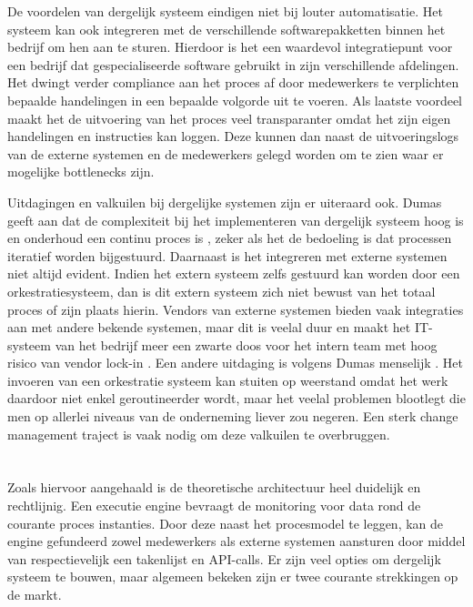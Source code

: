 De voordelen van dergelijk systeem eindigen niet bij louter automatisatie. Het systeem kan ook integreren met de verschillende softwarepakketten binnen het bedrijf om hen aan te sturen. Hierdoor is het een waardevol integratiepunt voor een bedrijf dat gespecialiseerde software gebruikt in zijn verschillende afdelingen. Het dwingt verder compliance aan het proces af door medewerkers te verplichten bepaalde handelingen in een bepaalde volgorde uit te voeren. Als laatste voordeel maakt het de uitvoering van het proces veel transparanter omdat het zijn eigen handelingen en instructies kan loggen. Deze kunnen dan naast de uitvoeringslogs van de externe systemen en de medewerkers gelegd worden om te zien waar er mogelijke bottlenecks zijn. \newline

Uitdagingen en valkuilen bij dergelijke systemen zijn er uiteraard ook. Dumas geeft aan dat de complexiteit bij het implementeren van dergelijk systeem hoog is en onderhoud een continu proces is \autocite[pp. 360-363]{Dumas2018}, zeker als het de bedoeling is dat processen iteratief worden bijgestuurd. Daarnaast is het integreren met externe systemen niet altijd evident. Indien het extern systeem zelfs gestuurd kan worden door een orkestratiesysteem, dan is dit extern systeem zich niet bewust van het totaal proces of zijn plaats hierin. Vendors van externe systemen bieden vaak integraties aan met andere bekende systemen, maar dit is veelal duur en maakt het IT-systeem van het bedrijf meer een zwarte doos voor het intern team met hoog risico van vendor lock-in \autocite[p. 364]{Dumas2018}. Een andere uitdaging is volgens Dumas menselijk \autocite[p. 365]{Dumas2018}. Het invoeren van een orkestratie systeem kan stuiten op weerstand omdat het werk daardoor niet enkel geroutineerder wordt, maar het veelal problemen blootlegt die men op allerlei niveaus van de onderneming liever zou negeren. Een sterk change management traject is vaak nodig om deze valkuilen te overbruggen. \newline

\section{}%
\label{sec:proces monitoring en orkestratie als IT-systeem}
Zoals hiervoor aangehaald is de theoretische architectuur heel duidelijk en rechtlijnig. Een executie engine bevraagt de monitoring voor data rond de courante proces instanties. Door deze naast het procesmodel te leggen, kan de engine gefundeerd zowel medewerkers als externe systemen aansturen door middel van respectievelijk een takenlijst en API-calls. Er zijn veel opties om dergelijk systeem te bouwen, maar algemeen bekeken zijn er twee courante strekkingen op de markt. \newline

